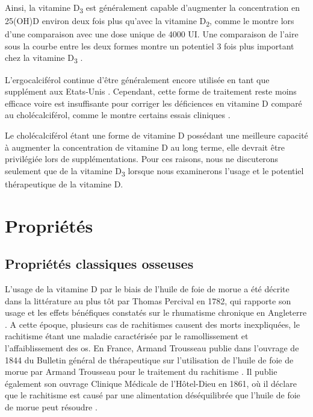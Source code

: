 \documentclass[
  a4paper,
  DIV=11,
  numbers=noendperiod,
  listof=totoc]{scrreprt}
\begin{document}
Ainsi, la vitamine D\textsubscript{3} est généralement capable
d'augmenter la concentration en 25(OH)D environ deux fois plus qu'avec
la vitamine D\textsubscript{2}, comme le montre \textcite{Trang.1998}
lors d'une comparaison avec une dose unique de 4000 UI. Une comparaison
de l'aire sous la courbe entre les deux formes montre un potentiel 3
fois plus important chez la vitamine D\textsubscript{3}
\autocite{Armas.2004}.

L'ergocalciférol continue d'être généralement encore utilisée en tant
que supplément aux Etats-Unis \autocite{Houghton.2006}. Cependant, cette
forme de traitement reste moins efficace voire est insuffisante pour
corriger les déficiences en vitamine D comparé au cholécalciférol, comme
le montre certains essais cliniques \autocite{Boyle.2005}.

Le cholécalciférol étant une forme de vitamine D possédant une meilleure
capacité à augmenter la concentration de vitamine D au long terme, elle
devrait être privilégiée lors de supplémentations. Pour ces raisons,
nous ne discuterons seulement que de la vitamine D\textsubscript{3}
lorsque nous examinerons l'usage et le potentiel thérapeutique de la
vitamine D.

\hypertarget{propriuxe9tuxe9s}{%
\section{Propriétés}\label{propriuxe9tuxe9s}}

\hypertarget{propriuxe9tuxe9s-classiques-osseuses}{%
\subsection{Propriétés classiques
osseuses}\label{propriuxe9tuxe9s-classiques-osseuses}}

L'usage de la vitamine D par le biais de l'huile de foie de morue a été
décrite dans la littérature au plus tôt par Thomas Percival en 1782, qui
rapporte son usage et les effets bénéfiques constatés sur le rhumatisme
chronique en Angleterre \autocite{Percival.1782}. A cette époque,
plusieurs cas de rachitismes causent des morts inexpliquées, le
rachitisme étant une maladie caractérisée par le ramollissement et
l'affaiblissement des os. En France, Armand Trousseau publie dans
l'ouvrage de 1844 du Bulletin général de thérapeutique sur l'utilisation
de l'huile de foie de morue par Armand Trousseau pour le traitement du
rachitisme \autocite{bulletin.1844}. Il publie également son ouvrage
Clinique Médicale de l'Hôtel-Dieu en 1861, où il déclare que le
rachitisme est causé par une alimentation déséquilibrée que l'huile de
foie de morue peut résoudre \autocite{Hernigou.2019}.
\end{document}
